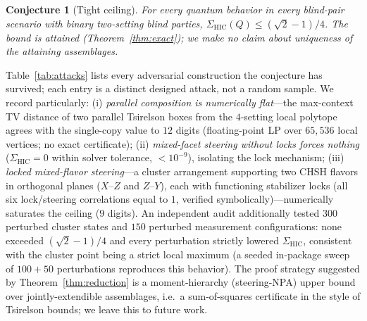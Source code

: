 \documentclass[10pt,twocolumn]{article}
\newtheorem{conjecture}{Conjecture}
\newcommand{\Sig}{\Sigma_{\mathrm{HIC}}}
\begin{document}
\begin{conjecture}[Tight ceiling]
\label{conj:tight}
For every quantum behavior in every blind-pair scenario with binary two-setting blind parties, $\Sig(Q) \le (\sqrt2-1)/4$. The bound is attained (Theorem~\ref{thm:exact}); we make no claim about uniqueness of the attaining assemblages.
\end{conjecture}

Table~\ref{tab:attacks} lists every adversarial construction the conjecture has survived; each entry is a distinct designed attack, not a random sample. We record particularly: (i) \emph{parallel composition is numerically flat}---the max-context TV distance of two parallel Tsirelson boxes from the $4$-setting local polytope agrees with the single-copy value to $12$ digits (floating-point LP over $65{,}536$ local vertices; no exact certificate); (ii) \emph{mixed-facet steering without locks forces nothing} ($\Sig=0$ within solver tolerance, $<10^{-9}$), isolating the lock mechanism; (iii) \emph{locked mixed-flavor steering}---a cluster arrangement supporting two CHSH flavors in orthogonal planes ($X$--$Z$ and $Z$--$Y$), each with functioning stabilizer locks (all six lock/steering correlations equal to $1$, verified symbolically)---numerically saturates the ceiling ($9$ digits). An independent audit additionally tested $300$ perturbed cluster states and $150$ perturbed measurement configurations: none exceeded $(\sqrt2-1)/4$ and every perturbation strictly lowered $\Sig$, consistent with the cluster point being a strict local maximum (a seeded in-package sweep of $100{+}50$ perturbations reproduces this behavior). The proof strategy suggested by Theorem~\ref{thm:reduction} is a moment-hierarchy (steering-NPA) upper bound over jointly-extendible assemblages, i.e.\ a sum-of-squares certificate in the style of Tsirelson bounds; we leave this to future work.
\end{document}

